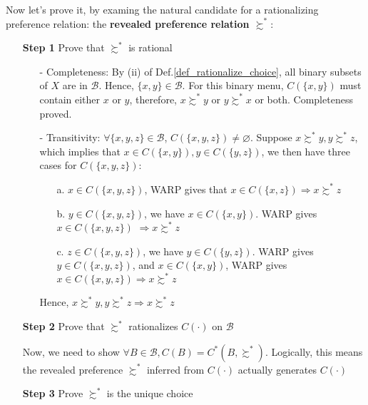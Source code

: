 Now let's prove it, by examing the natural candidate for a rationalizing preference relation: the \textbf{revealed preference relation $\succsim^*$}:
\begin{enumerate}
    \item[\textbf{Step 1}] Prove that $\succsim^*$ is rational
    \begin{enumerate}
        \item[-] Completeness: By (ii) of Def.\ref{def_rationalize_choice}, all binary subsets of $X$ are in $\mathcal{B}$. Hence, $\{x,y\}\in\mathcal{B}$. For this binary menu, $C(\{x,y\})$ must contain either $x$ or $y$, therefore, $x\succsim^*y$ or $y\succsim^* x$ or both. Completeness proved.
        \item[-] Transitivity: $\forall\{x,y,z\}\in \mathcal{B}$, $C(\{x,y,z\})\neq \varnothing$. Suppose $x\succsim^*y,y\succsim^*z$, which implies that $x\in C(\{x,y\}),y\in C(\{y,z\})$, we then have three cases for $C(\{x,y,z\})$:
        \begin{enumerate}
            \item[a.] $x\in C(\{x,y,z\})$, WARP gives that $x\in C(\{x,z\})\Rightarrow x\succsim^*z$
            \item[b.] $y\in C(\{x,y,z\})$, we have $x\in C(\{x,y\})$. WARP gives $x\in C(\{x,y,z\})$ $\Rightarrow x\succsim^* z$
            \item[c.] $z\in C(\{x,y,z\})$, we have $y\in C(\{y,z\})$. WARP gives $y\in C(\{x,y,z\})$, and $x\in C(\{x,y\})$, WARP gives $x\in C(\{x,y,z\})\Rightarrow x\succsim^*z$
        \end{enumerate} 
        Hence, $x\succsim^*y,y\succsim^*z\Rightarrow x\succsim^* z$
    \end{enumerate} 
    \item[\textbf{Step 2}] Prove that $\succsim^*$ rationalizes $C(\cdot)$ on $\mathcal{B}$
    
    Now, we need to show $\forall B\in\mathcal{B}, C(B)=C^*(B,\succsim^*)$. Logically, this means the revealed preference $\succsim^*$ inferred from $C(\cdot)$ actually generates $C(\cdot)$
    \item[\textbf{Step 3}] Prove $\succsim^*$ is the unique choice
\end{enumerate}
